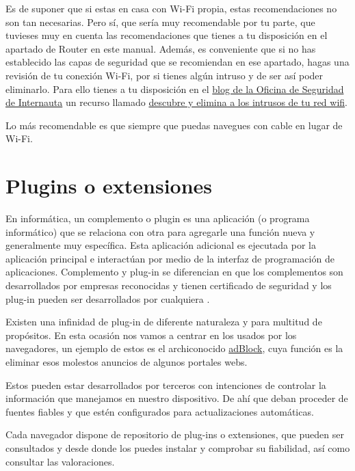 \documentclass[
  spanish,
  a4paper,
  openany]{book}
\begin{document}
Es de suponer que si estas en casa con Wi-Fi propia, estas recomendaciones no son tan necesarias. Pero sí, que sería muy recomendable por tu parte, que tuvieses muy en cuenta las recomendaciones que tienes a tu disposición en el apartado de Router en este manual. Además, es conveniente que si no has establecido las capas de seguridad que se recomiendan en ese apartado, hagas una revisión de tu conexión Wi-Fi, por si tienes algún intruso y de ser así poder eliminarlo. Para ello tienes a tu disposición en el \href{https://www.osi.es/es/actualidad/blog}{blog de la Oficina de Seguridad de Internauta} un recurso llamado \href{https://www.osi.es/es/actualidad/blog/2019/09/25/descubre-y-elimina-los-intrusos-de-tu-red-wifi}{descubre y elimina a los intrusos de tu red wifi}.

Lo más recomendable es que siempre que puedas navegues con cable en lugar de Wi-Fi.

\hypertarget{plugins-o-extensiones}{%
\section{Plugins o extensiones}\label{plugins-o-extensiones}}

En informática, un complemento o plugin es una aplicación (o programa informático) que se relaciona con otra para agregarle una función nueva y generalmente muy específica. Esta aplicación adicional es ejecutada por la aplicación principal e interactúan por medio de la interfaz de programación de aplicaciones. Complemento y plug-in se diferencian en que los complementos son desarrollados por empresas reconocidas y tienen certificado de seguridad y los plug-in pueden ser desarrollados por cualquiera \citep{IONOS-plugin}.

Existen una infinidad de plug-in de diferente naturaleza y para multitud de propósitos. En esta ocasión nos vamos a centrar en los usados por los navegadores, un ejemplo de estos es el archiconocido \href{https://getadblock.com/}{adBlock}, cuya función es la eliminar esos molestos anuncios de algunos portales webs.

Estos pueden estar desarrollados por terceros con intenciones de controlar la información que manejamos en nuestro dispositivo. De ahí que deban proceder de fuentes fiables y que estén configurados para actualizaciones automáticas.

Cada navegador dispone de repositorio de plug-ins o extensiones, que pueden ser consultados y desde donde los puedes instalar y comprobar su fiabilidad, así como consultar las valoraciones.
\end{document}
